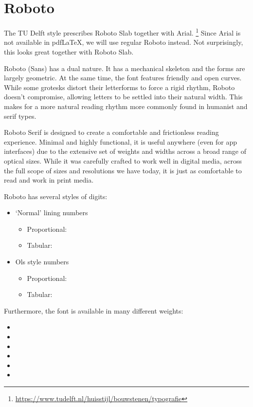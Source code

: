 \section{Roboto}

The TU Delft style prescribes Roboto Slab together with Arial.%
\footnote{\url{https://www.tudelft.nl/huisstijl/bouwstenen/typografie}}
Since Arial is not available in pdf\LaTeX, we will use regular Roboto instead.
Not surprisingly, this looks great together with Roboto Slab.

Roboto (Sans) has a dual nature. It has a mechanical skeleton
and the forms are largely geometric. At the same time,
the font features friendly and open curves. While some
grotesks distort their letterforms to force a rigid
rhythm, Roboto doesn't compromise, allowing letters to be
settled into their natural width. This makes for a more
natural reading rhythm more commonly found in humanist and
serif types.

Roboto Serif is designed to create a comfortable
and frictionless reading experience. Minimal and
highly functional, it is useful anywhere (even for app
interfaces) due to the extensive set of weights and widths
across a broad range of optical sizes. While it was
carefully crafted to work well in digital media, across
the full scope of sizes and resolutions we have today, it
is just as comfortable to read and work in print media.

Roboto has several styles of digits:
\begin{itemize}
    \item `Normal' lining numbers
    \begin{itemize}
        \item Proportional: 
        \item Tabular: 
    \end{itemize}
    \item Ols style numbers
    \begin{itemize}
        \item Proportional: 
        \item Tabular: 
    \end{itemize}
\end{itemize}

Furthermore, the font is available in many different weights:
\begin{itemize}
    \itemsep 0pt
    \parskip 0pt
    \item {}
    \item {}
    \item {}     
    \item {}      
    \item {}
    \item {}    
\end{itemize}

